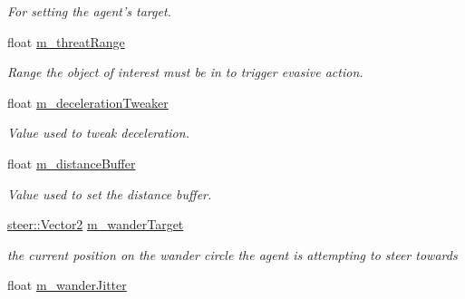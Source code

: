 \begin{DoxyCompactItemize}
\begin{DoxyCompactList}\small\item\em For setting the agent's target. \end{DoxyCompactList}\item 
\hypertarget{classsteer_1_1_agent_a21c017c11309bec6e38e76361f630455}{float \hyperlink{classsteer_1_1_agent_a21c017c11309bec6e38e76361f630455}{m\-\_\-threat\-Range}}\label{classsteer_1_1_agent_a21c017c11309bec6e38e76361f630455}

\begin{DoxyCompactList}\small\item\em Range the object of interest must be in to trigger evasive action. \end{DoxyCompactList}\item 
\hypertarget{classsteer_1_1_agent_ab600b61ca90b8f0bc1af498e5654d098}{float \hyperlink{classsteer_1_1_agent_ab600b61ca90b8f0bc1af498e5654d098}{m\-\_\-deceleration\-Tweaker}}\label{classsteer_1_1_agent_ab600b61ca90b8f0bc1af498e5654d098}

\begin{DoxyCompactList}\small\item\em Value used to tweak deceleration. \end{DoxyCompactList}\item 
\hypertarget{classsteer_1_1_agent_a8beb6a135392910d5e55339c7746263d}{float \hyperlink{classsteer_1_1_agent_a8beb6a135392910d5e55339c7746263d}{m\-\_\-distance\-Buffer}}\label{classsteer_1_1_agent_a8beb6a135392910d5e55339c7746263d}

\begin{DoxyCompactList}\small\item\em Value used to set the distance buffer. \end{DoxyCompactList}\item 
\hypertarget{classsteer_1_1_agent_afa1c07fbea2b54bf3a404153a0cd61c0}{\hyperlink{structsteer_1_1_vector2}{steer\-::\-Vector2} \hyperlink{classsteer_1_1_agent_afa1c07fbea2b54bf3a404153a0cd61c0}{m\-\_\-wander\-Target}}\label{classsteer_1_1_agent_afa1c07fbea2b54bf3a404153a0cd61c0}

\begin{DoxyCompactList}\small\item\em the current position on the wander circle the agent is attempting to steer towards \end{DoxyCompactList}\item 
\hypertarget{classsteer_1_1_agent_abccf322de46725b1c42ee92673397067}{float \hyperlink{classsteer_1_1_agent_abccf322de46725b1c42ee92673397067}{m\-\_\-wander\-Jitter}}\label{classsteer_1_1_agent_abccf322de46725b1c42ee92673397067}


\end{DoxyCompactItemize}
